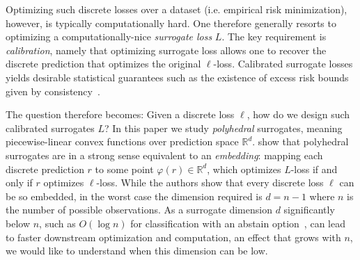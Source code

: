 \documentclass[anon]{colt2020} %
\newcommand{\reals}{\mathbb{R}}
\begin{document}
Optimizing such discrete losses over a dataset (i.e. empirical risk minimization), however, is typically computationally hard.
One therefore generally resorts to optimizing a computationally-nice \emph{surrogate loss} $L$.
The key requirement is \emph{calibration}, namely that optimizing surrogate loss allows one to recover the discrete prediction that optimizes the original $\ell$-loss.
Calibrated surrogate losses yields desirable statistical guarantees such as the existence of excess risk bounds given by consistency~\citep{tewari2007consistency}.

The question therefore becomes: Given a discrete loss $\ell$, how do we design such calibrated surrogates $L$? 
In this paper we study \emph{polyhedral} surrogates, meaning piecewise-linear convex functions over prediction space $\reals^d$.
\cite{finocchiaro2019embedding} show that polyhedral surrogates are in a strong sense equivalent to an \emph{embedding}: %
mapping each discrete prediction $r$ to some point $\varphi(r) \in \reals^d$, which optimizes $L$-loss if and only if $r$ optimizes $\ell$-loss.
While the authors show that every discrete loss $\ell$ can be so embedded, in the worst case the dimension required is $d=n-1$ where $n$ is the number of possible observations.
As a surrogate dimension $d$ significantly below $n$, such as $O(\log n)$ for classification with an abstain option~\citep{ramaswamy2018consistent}, can lead to faster downstream optimization and computation, an effect that grows with $n$, we would like to understand when this dimension can be low.
\end{document}
